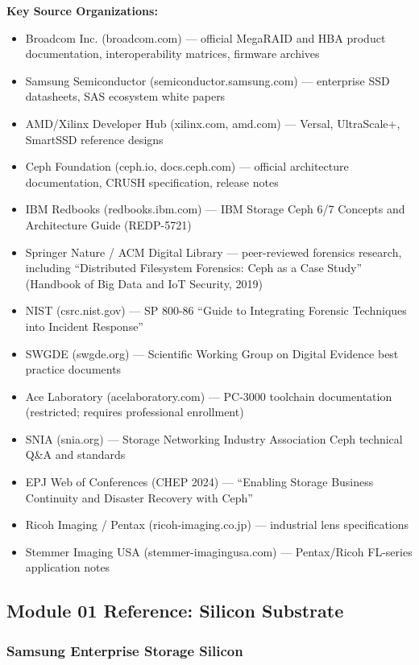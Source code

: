 \documentclass[11pt,letterpaper]{article}
\begin{document}
\textbf{Key Source Organizations:}
\begin{itemize}[leftmargin=*]
  \item Broadcom Inc. (broadcom.com) --- official MegaRAID and HBA product documentation, interoperability matrices, firmware archives
  \item Samsung Semiconductor (semiconductor.samsung.com) --- enterprise SSD datasheets, SAS ecosystem white papers
  \item AMD/Xilinx Developer Hub (xilinx.com, amd.com) --- Versal, UltraScale+, SmartSSD reference designs
  \item Ceph Foundation (ceph.io, docs.ceph.com) --- official architecture documentation, CRUSH specification, release notes
  \item IBM Redbooks (redbooks.ibm.com) --- IBM Storage Ceph 6/7 Concepts and Architecture Guide (REDP-5721)
  \item Springer Nature / ACM Digital Library --- peer-reviewed forensics research, including ``Distributed Filesystem Forensics: Ceph as a Case Study'' (Handbook of Big Data and IoT Security, 2019)
  \item NIST (csrc.nist.gov) --- SP 800-86 ``Guide to Integrating Forensic Techniques into Incident Response''
  \item SWGDE (swgde.org) --- Scientific Working Group on Digital Evidence best practice documents
  \item Ace Laboratory (acelaboratory.com) --- PC-3000 toolchain documentation (restricted; requires professional enrollment)
  \item SNIA (snia.org) --- Storage Networking Industry Association Ceph technical Q\&A and standards
  \item EPJ Web of Conferences (CHEP 2024) --- ``Enabling Storage Business Continuity and Disaster Recovery with Ceph''
  \item Ricoh Imaging / Pentax (ricoh-imaging.co.jp) --- industrial lens specifications
  \item Stemmer Imaging USA (stemmer-imagingusa.com) --- Pentax/Ricoh FL-series application notes
\end{itemize}

\subsection{Module 01 Reference: Silicon Substrate}

\subsubsection{Samsung Enterprise Storage Silicon}
\end{document}
